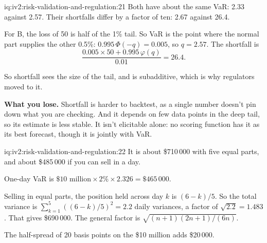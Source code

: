 \begin{solution}{iq:iv2:risk-validation-and-regulation:21}
Both have about the same VaR: 2.33 against 2.57. Their shortfalls differ by a factor of ten: 2.67 against 26.4.

For B, the loss of 50 is half of the 1\% tail. So VaR is the point where the normal part supplies the other 0.5\%: $0.995\,\Phi(-q) = 0.005$, so $q = 2.57$. The shortfall is
\[
\frac{0.005 \times 50 + 0.995\,\varphi(q)}{0.01} = 26.4.
\]

So shortfall sees the size of the tail, and is subadditive, which is why regulators moved to it.

\textbf{What you lose.} Shortfall is harder to backtest, as a single number doesn't pin down what you are checking. And it depends on few data points in the deep tail, so its estimate is less stable. It isn't elicitable alone: no scoring function has it as its best forecast, though it is jointly with VaR.

\end{solution}

\begin{solution}{iq:iv2:risk-validation-and-regulation:22}
It is about \$710\,000 with five equal parts, and about \$485\,000 if you can sell in a day.

One-day VaR is $\$10 \text{ million} \times 2\% \times 2.326 = \$465\,000$.

Selling in equal parts, the position held across day $k$ is $(6 - k)/5$. So the total variance is $\sum_{k=1}^{5}((6 - k)/5)^2 = 2.2$ daily variances, a factor of $\sqrt{2.2} = 1.483$. That gives \$690\,000. The general factor is $\sqrt{(n + 1)(2n + 1)/(6n)}$.

The half-spread of 20 basis points on the \$10 million adds \$20\,000.

\end{solution}


